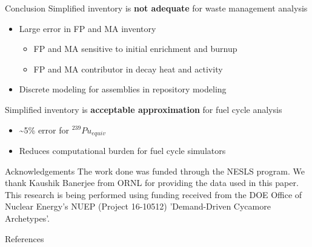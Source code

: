 \documentclass[final]{beamer}
\newlength{\onecolwid}
\newlength{\threecolwid}
\begin{document}
\begin{frame}[t]
\begin{columns}[t,totalwidth=\threecolwid]
\begin{column}{\onecolwid}
\begin{alertblock}{Conclusion}
Simplified inventory is \textbf{not adequate} for waste management analysis
    \begin{itemize}
        \item Large error in FP and MA inventory
        \begin{itemize}
            \item FP and MA sensitive to initial enrichment and burnup
            \item FP and MA contributor in decay heat and activity
        \end{itemize}
        \item Discrete modeling for assemblies in repository modeling
    \end{itemize}
\bigskip \bigskip

Simplified inventory is \textbf{acceptable approximation} for fuel cycle analysis
    \begin{itemize}
        \item \textasciitilde 5\% error for $^{239}Pu_{equiv}$
        \item Reduces computational burden for fuel cycle simulators
    \end{itemize}
\end{alertblock}



\begin{block}{Acknowledgements}
The work done was funded through the NESLS program. We thank Kaushik Banerjee
from ORNL for providing the data used
in this paper.
This research is being performed using funding received from the DOE Office
of Nuclear Energy's NUEP
(Project 16-10512) 'Demand-Driven Cycamore Archetypes'.

\end{block}


\begin{block}{References}

        {\footnotesize 
        }
\end{block}




\end{column}
\end{columns}
\end{frame}
\end{document}
